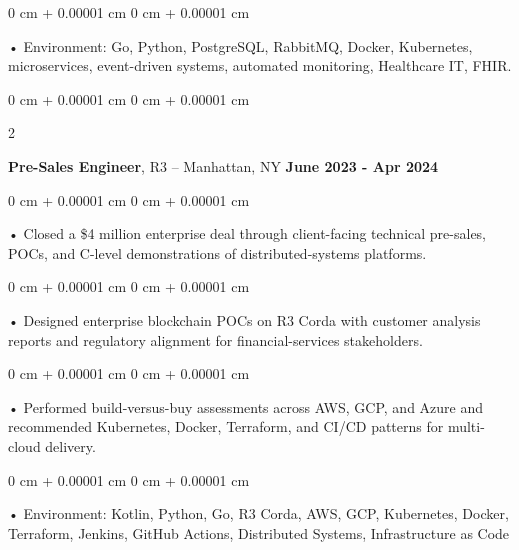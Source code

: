 \documentclass[10pt, letterpaper]{article}
\newenvironment{onecolentry}{
    \begin{adjustwidth}{
        0 cm + 0.00001 cm
    }{
        0 cm + 0.00001 cm
    }
}{
    \end{adjustwidth}
} %
\newenvironment{twocolentry}[2][]{
    \onecolentry
    \def\secondColumn{#2}
    \setcolumnwidth{\fill, 4.5 cm}
    \begin{paracol}{2}
}{
    \switchcolumn \raggedleft \secondColumn
    \end{paracol}
    \endonecolentry
} %
\begin{document}
        \begin{onecolentry}
             • Environment: Go, Python, PostgreSQL, RabbitMQ, Docker, Kubernetes, microservices, event-driven systems, automated monitoring, Healthcare IT, FHIR.
        \end{onecolentry}
        \vspace{0.1cm}

        \begin{twocolentry}{
            \textbf{June 2023 - Apr 2024}
        }
            \textbf{Pre-Sales Engineer}, R3 -- Manhattan, NY\end{twocolentry}


        \begin{onecolentry}
             • Closed a \$4 million enterprise deal through client-facing technical pre-sales, POCs, and C-level demonstrations of distributed-systems platforms.
        \end{onecolentry}
        \begin{onecolentry}
             • Designed enterprise blockchain POCs on R3 Corda with customer analysis reports and regulatory alignment for financial-services stakeholders.
        \end{onecolentry}
        \begin{onecolentry}
             • Performed build-versus-buy assessments across AWS, GCP, and Azure and recommended Kubernetes, Docker, Terraform, and CI/CD patterns for multi-cloud delivery.
        \end{onecolentry}
        \begin{onecolentry}
             • Environment: Kotlin, Python, Go, R3 Corda, AWS, GCP, Kubernetes, Docker, Terraform, Jenkins, GitHub Actions, Distributed Systems, Infrastructure as Code
        \end{onecolentry}
        \vspace{0.1cm}
\end{document}
